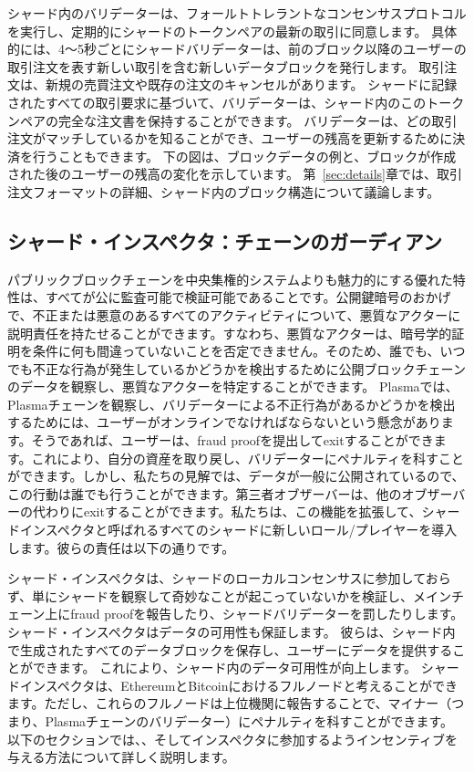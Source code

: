 シャード内のバリデーターは、フォールトトレラントなコンセンサスプロトコルを実行し、定期的にシャードのトークンペアの最新の取引に同意します。 具体的には、4〜5秒ごとにシャードバリデーターは、前のブロック以降のユーザーの取引注文を表す新しい取引を含む新しいデータブロックを発行します。 取引注文は、新規の売買注文や既存の注文のキャンセルがあります。 シャードに記録されたすべての取引要求に基づいて、バリデーターは、シャード内のこのトークンペアの完全な注文書を保持することができます。 バリデーターは、どの取引注文がマッチしているかを知ることができ、ユーザーの残高を更新するために決済を行うこともできます。 下の図は、ブロックデータの例と、ブロックが作成された後のユーザーの残高の変化を示しています。 第~\ref{sec:details}章では、取引注文フォーマットの詳細、シャード内のブロック構造について議論します。

\subsection{シャード・インスペクタ：チェーンのガーディアン}

パブリックブロックチェーンを中央集権的システムよりも魅力的にする優れた特性は、すべてが公に監査可能で検証可能であることです。公開鍵暗号のおかげで、不正または悪意のあるすべてのアクティビティについて、悪質なアクターに説明責任を持たせることができます。すなわち、悪質なアクターは、暗号学的証明を条件に何も間違っていないことを否定できません。そのため、誰でも、いつでも不正な行為が発生しているかどうかを検出するために公開ブロックチェーンのデータを観察し、悪質なアクターを特定することができます。 Plasmaでは、Plasmaチェーンを観察し、バリデーターによる不正行為があるかどうかを検出するためには、ユーザーがオンラインでなければならないという懸念があります。そうであれば、ユーザーは、fraud proofを提出してexitすることができます。これにより、自分の資産を取り戻し、バリデーターにペナルティを科すことができます。しかし、私たちの見解では、データが一般に公開されているので、この行動は誰でも行うことができます。第三者オブザーバーは、他のオブザーバーの代わりにexitすることができます。私たちは、この機能を拡張して、シャー​​ドインスペクタと呼ばれるすべてのシャードに新しいロール/プレイヤーを導入します。彼らの責任は以下の通りです。

シャード・インスペクタは、シャードのローカルコンセンサスに参加しておらず、単にシャードを観察して奇妙なことが起こっていないかを検証し、メインチェーン上にfraud proofを報告したり、シャードバリデーターを罰したりします。 シャード・インスペクタはデータの可用性も保証します。 彼らは、シャード内で生成されたすべてのデータブロックを保存し、ユーザーにデータを提供することができます。 これにより、シャード内のデータ可用性が向上します。 シャードインスペクタは、EthereumとBitcoinにおけるフルノードと考えることができます。ただし、これらのフルノードは上位機関に報告することで、マイナー（つまり、Plasmaチェーンのバリデーター）にペナルティを科すことができます。 以下のセクションでは、、そしてインスペクタに参加するようインセンティブを与える方法について詳しく説明します。

